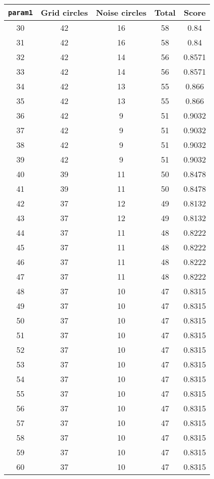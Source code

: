 \documentclass[letterpaper, 12pt]{article}
\begin{document}
\begin{longtable}{|c|c|c|c|c|}
\hline
\textbf{\texttt{param1}} & \textbf{Grid circles} & \textbf{Noise circles} & \textbf{Total} & \textbf{Score} \\
\hline
30 & 42 & 16 & 58 & 0.84 \\
\hline
31 & 42 & 16 & 58 & 0.84 \\
\hline
32 & 42 & 14 & 56 & 0.8571 \\
\hline
33 & 42 & 14 & 56 & 0.8571 \\
\hline
34 & 42 & 13 & 55 & 0.866 \\
\hline
35 & 42 & 13 & 55 & 0.866 \\
\hline
36 & 42 & 9 & 51 & 0.9032 \\
\hline
37 & 42 & 9 & 51 & 0.9032 \\
\hline
38 & 42 & 9 & 51 & 0.9032 \\
\hline
39 & 42 & 9 & 51 & 0.9032 \\
\hline
40 & 39 & 11 & 50 & 0.8478 \\
\hline
41 & 39 & 11 & 50 & 0.8478 \\
\hline
42 & 37 & 12 & 49 & 0.8132 \\
\hline
43 & 37 & 12 & 49 & 0.8132 \\
\hline
44 & 37 & 11 & 48 & 0.8222 \\
\hline
45 & 37 & 11 & 48 & 0.8222 \\
\hline
46 & 37 & 11 & 48 & 0.8222 \\
\hline
47 & 37 & 11 & 48 & 0.8222 \\
\hline
48 & 37 & 10 & 47 & 0.8315 \\
\hline
49 & 37 & 10 & 47 & 0.8315 \\
\hline
50 & 37 & 10 & 47 & 0.8315 \\
\hline
51 & 37 & 10 & 47 & 0.8315 \\
\hline
52 & 37 & 10 & 47 & 0.8315 \\
\hline
53 & 37 & 10 & 47 & 0.8315 \\
\hline
54 & 37 & 10 & 47 & 0.8315 \\
\hline
55 & 37 & 10 & 47 & 0.8315 \\
\hline
56 & 37 & 10 & 47 & 0.8315 \\
\hline
57 & 37 & 10 & 47 & 0.8315 \\
\hline
58 & 37 & 10 & 47 & 0.8315 \\
\hline
59 & 37 & 10 & 47 & 0.8315 \\
\hline
60 & 37 & 10 & 47 & 0.8315 \\

\end{longtable}
\end{document}
